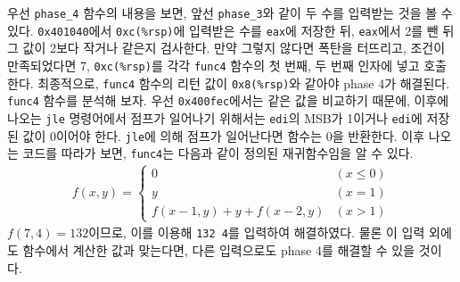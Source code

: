 \documentclass{scrartcl}
\begin{document}
우선 \texttt{phase\_4} 함수의 내용을 보면, 앞선 \texttt{phase\_3}와 같이 두
수를 입력받는 것을 볼 수 있다. \texttt{0x401040}에서 \texttt{0xc(\%rsp)}에
입력받은 수를 \texttt{eax}에 저장한 뒤, \texttt{eax}에서 2를 뺀 뒤 그 값이
2보다 작거나 같은지 검사한다. 만약 그렇지 않다면 폭탄을 터뜨리고, 조건이
만족되었다면 7, \texttt{0xc(\%rsp)}를 각각 \texttt{func4} 함수의 첫 번째, 두
번째 인자에 넣고 호출한다. 최종적으로, \texttt{func4} 함수의 리턴 값이
\texttt{0x8(\%rsp)}와 같아야 phase 4가 해결된다. \texttt{func4} 함수를 분석해
보자. 우선 \texttt{0x400fec}에서는 같은 값을 비교하기 때문에, 이후에 나오는
\texttt{jle} 명령어에서 점프가 일어나기 위해서는 \texttt{edi}의 MSB가 1이거나
\texttt{edi}에 저장된 값이 0이어야 한다. \texttt{jle}에 의해 점프가 일어난다면
함수는 0을 반환한다. 이후 나오는 코드를 따라가 보면, \texttt{func4}는 다음과
같이 정의된 재귀함수임을 알 수 있다.
\begin{align*}
  f(x, y) = \begin{cases}
    0 & (x \le 0) \\
    y & (x = 1) \\
    f(x - 1, y) + y + f(x - 2, y) & (x > 1)
  \end{cases}
\end{align*}
\(f(7, 4) = 132\)이므로, 이를 이용해 \texttt{132 4}를 입력하여 해결하였다. 물론
이 입력 외에도 함수에서 계산한 값과 맞는다면, 다른 입력으로도 phase 4를 해결할
수 있을 것이다.
\end{document}
